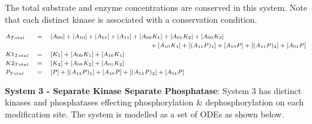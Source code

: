 \documentclass[9pt,lineno]{elife}
\begin{document}
\begin{appendixbox}
The total substrate and enzyme concentrations are conserved in this system. Note that each distinct kinase is associated with a conservation condition.

\begin{equation}
\scriptsize{    \begin{alignedat}{3}
& A_{Total} \quad &&= \quad [A_{00}]+[A_{10}]+[A_{01}]+[A_{11}]+[A_{00}K_1]+[A_{01}K_2]+[A_{00}K_2] && \\
        & && \hspace{50mm} + [A_{10}K_1]+[(A_{11}P)_1]+[A_{10}P]+[(A_{11}P)_2]+[A_{01}P] && \\
        & K1_{Total} \quad &&= \quad [K_1]+[A_{00}K_1]+[A_{10}K_1] && \\
        & K2_{Total} \quad &&= \quad [K_2]+[A_{00}K_2]+[A_{01}K_2] && \\
        & P_{Total} \quad &&= \quad [P]+[(A_{11}P)_1]+[A_{10}P]+[(A_{11}P)_2]+[A_{01}P] && \\
    \end{alignedat} }
\end{equation}
    
\textbf{System 3 - Separate Kinase Separate Phosphatase}: System 3 has distinct kinases and  phosphatases effecting phosphorylation \& dephosphorylation on each modification site. The system is modelled as a set of ODEs as shown below. 


\end{appendixbox}
\end{document}
